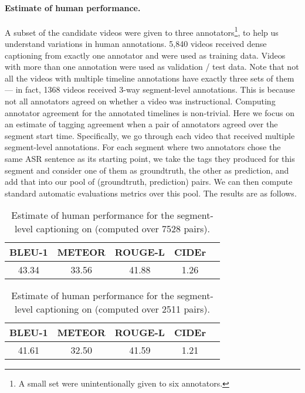\documentclass[11pt,a4paper]{article}
\begin{document}
\paragraph{Estimate of human performance.}
A subset of the candidate videos were given to three annotators\footnote{A small set were unintentionally given to six annotators.}, to help us understand variations in human annotations.
5,840 videos received dense captioning from exactly one annotator and were used as training data.
Videos with more than one annotation were used as validation / test data.  Note that not all the videos with multiple timeline annotations have exactly three sets of them --- in fact, 1368 videos received 3-way segment-level annotations.  This is because not all annotators agreed on whether a video was instructional.   Computing annotator agreement for the annotated timelines is non-trivial.  Here we focus on an estimate of tagging agreement when a pair of annotators agreed over the segment start time.  Specifically, we go through each video that received multiple segment-level annotations.  For each segment where two annotators chose the same ASR sentence as its starting point, we take the tags they produced for this segment and consider one of them as groundtruth, the other as prediction, and add that into our pool of (groundtruth, prediction) pairs.  We can then compute standard automatic evaluations metrics over this pool.  The results are as follows.
\begin{table}[h!]
    \centering
    \begin{tabular}{ccccc} \hline
        BLEU-1 & METEOR & ROUGE-L & CIDEr   \\ \hline
        43.34 &33.56 &41.88 &1.26    \\ \hline
    \end{tabular}
    \caption{Estimate of human performance for the segment-level captioning on \ldvmmerged (computed over 7528 pairs).}
    \label{tab:human_performance}
\end{table}
\begin{table}[h!]
    \centering
    \begin{tabular}{ccccc} \hline
        BLEU-1 & METEOR & ROUGE-L & CIDEr   \\ \hline
        41.61 & 32.50 & 41.59 & 1.21    \\ \hline
    \end{tabular}
    \caption{Estimate of human performance for the segment-level captioning on \ldvmcooking  (computed over 2511 pairs).}
    \label{tab:human_performance}
\end{table}
\end{document}
